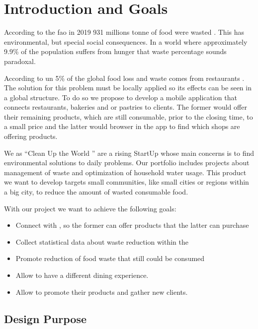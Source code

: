 \section{Introduction and Goals}

According to the \acrfull{fao} in 2019 931 millions tonne of food were wasted \cite{refart:FAOFW}. This has
environmental, but special social consequences. In a world where approximately 9.9\% of the \cite{refart:AAHWH}
population suffers from hunger that waste percentage sounds paradoxal.

According to \acrfull{un} 5\% of the global food loss and waste comes from restaurants \cite{refart:UNSP}. 
The solution for this problem must be locally applied so its effects can be seen in a global structure. To do 
so we propose to develop a mobile application that connects restaurants, bakeries and or pastries to clients. The
former would offer their remaining products, which are still consumable, prior to the closing time, to a small price
and the latter would browser in the app to find which shops are offering products. 

We as ``Clean Up the World \textregistered'' are a rising StartUp whose main concerns is to find environmental solutions to
daily problems. Our portfolio includes projects about management of waste and optimization of household water 
usage. This product we want to develop targets small communities, like small cities or regions within a big city, 
to reduce the amount of wasted consumable food.

With our project we want to achieve the following goals:

\begin{itemize}
    \item Connect  with , so the former can offer products that the latter
    can purchase
    \item Collect statistical data about waste reduction within the 
    \item Promote reduction of food waste that still could be consumed
    \item Allow  to have a different dining experience.
    \item Allow  to promote their products and gather new clients.

\end{itemize}

\subsection{Design Purpose}

